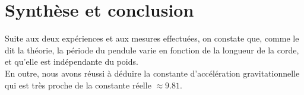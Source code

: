 \documentclass[12pt,a4paper]{article}
\begin{document}
    \section{Synthèse et conclusion}
    Suite aux deux expériences et aux mesures effectuées, on constate que, comme le dit la théorie, la période du pendule varie en fonction de la longueur de la corde, et qu'elle est indépendante du poids. \\
    En outre, nous avons réussi à déduire la constante d'accélération gravitationnelle qui est très proche de la constante réelle $\approx 9.81$.
\end{document}
